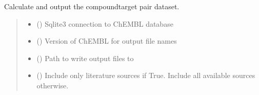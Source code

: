 \documentclass[letterpaper,10pt,english]{sphinxmanual}
\begin{document}
\begin{fulllineitems}
\label{\detokenize{get_dataset:get_dataset.get_ct_pair_dataset}}
\pysigstartsignatures
{}
\pysigstopsignatures
\sphinxAtStartPar
Calculate and output the compound\sphinxhyphen{}target pair dataset.
\begin{quote}\begin{description}
\begin{itemize}
\item {} 
\sphinxAtStartPar
{} () \textendash{} Sqlite3 connection to ChEMBL database

\item {} 
\sphinxAtStartPar
{} () \textendash{} Version of ChEMBL for output file names

\item {} 
\sphinxAtStartPar
{} () \textendash{} Path to write output files to

\item {} 
\sphinxAtStartPar
{} () \textendash{} Include only literature sources if True.
Include all available sources otherwise.


\end{itemize}
\end{description}
\end{quote}
\end{fulllineitems}
\end{document}
